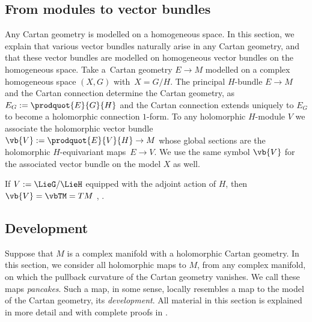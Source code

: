 \documentclass[10pt,a4paper]{amsart}
\numberwithin{equation}{section}
\begin{document}
\subsection{From modules to vector bundles}
Any Cartan geometry is modelled on a homogeneous space.
In this section, we explain that various vector bundles naturally arise in any Cartan geometry, and that these vector bundles are modelled on homogeneous vector
bundles \cite[Section 10]{mckay2023introduction} on the homogeneous space.
Take a~Cartan geometry $E \to M$ modelled on a complex homogeneous space $(X, G)$ with~${X = G/H}$.
The principal $H$-bundle $E \to M$ and the Cartan connection determine the Cartan geometry,
as $E_G := \prodquot{E}{G}{H}$ and the Cartan connection extends uniquely to $E_G$ to become a holomorphic connection $1$-form.
To any holomorphic $H$-module $V$ we associate the holomorphic vector bundle~$\vb{V} := \prodquot{E}{V}{H} \to M$
whose global sections are the holomorphic $H$-equivariant maps~${E \to V}$.
We use the same symbol $\vb{V}$ for the associated vector bundle on the model $X$ as well.

\begin{Example} If $V := \LieG/\LieH$ equipped with the adjoint action of $H$, then $\vb{V} = \vbTM = TM$
\cite[Proposition 1]{mckay2023introduction}, \cite[Theorem 3.15]{Sharpe:1997}.
\end{Example}

\subsection{Development}\label{subsection:Development}
Suppose that $M$ is a complex manifold with a holomorphic Cartan geometry.
In this section, we consider all holomorphic maps to $M$, from any complex manifold, on which the pullback curvature of the Cartan geometry vanishes.
We call these maps \emph{pancakes}.
Such a map, in some sense, locally resembles a map to the model of the Cartan geometry, its \emph{development}.
All material in this section is explained in more detail and with complete proofs
in \cite[Section 7]{mckay2023introduction}.
\end{document}
